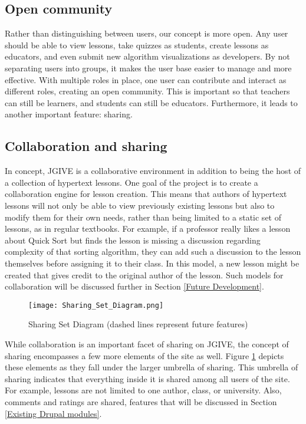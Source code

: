 \documentclass{acm_proc_article-sp}
\begin{document}
\subsection{Open community}
Rather than distinguishing between users, our concept is more open. Any user should be able to view lessons, take quizzes as students, create lessons as educators, and even submit new algorithm visualizations as developers. By not separating users into groups, it makes the user base easier to manage and more effective. With multiple roles in place, one user can contribute and interact as different roles, creating an open community. This is important so that teachers can still be learners, and students can still be educators. Furthermore, it leads to another important feature: sharing.

\subsection{Collaboration and sharing}
\label{Collaboration and sharing}
In concept, JGIVE is a collaborative environment in addition to being the host of a collection of hypertext lessons. One goal of the project is to create a collaboration engine for lesson creation. This means that authors of hypertext lessons will not only be able to view previously existing lessons but also to modify them for their own needs, rather than being limited to a static set of lessons, as in regular textbooks. For example, if a professor really likes a lesson about Quick Sort but finds the lesson is missing a discussion regarding complexity of that sorting algorithm, they can add such a discussion to the lesson themselves before assigning it to their class. In this model, a new lesson might be created that gives credit to the original author of the lesson. Such models for collaboration will be discussed further in Section \ref{Future Development}.

\begin{figure}[h]
  \begin{center}
    \texttt{[image: Sharing\_Set\_Diagram.png]}
  \end{center}
  \caption{Sharing Set Diagram (dashed lines represent future features)}
  \label{fig:Sharing Set Diagram}
\end{figure}

While collaboration is an important facet of sharing on JGIVE, the concept of sharing encompasses a few more elements of the site as well. Figure \ref{fig:Sharing Set Diagram} depicts these elements as they fall under the larger umbrella of sharing. This umbrella of sharing indicates that everything inside it is shared among all users of the site. For example, lessons are not limited to one author, class, or university. Also, comments and ratings are shared, features that will be discussed in Section \ref{Existing Drupal modules}.
\end{document}

